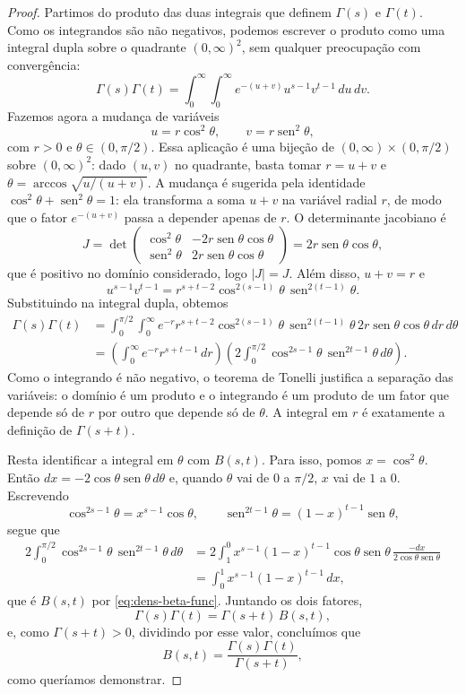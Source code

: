 \documentclass[12pt,portuguese]{article}
\theoremstyle{definition}
\theoremstyle{plainexercise}
\theoremstyle{starredexercise}
\theoremstyle{definition}
\renewcommand{\sin}{\operatorname{sen}}
\begin{document}
\begin{proof}
  Partimos do produto das duas integrais que definem $\Gamma(s)$ e
  $\Gamma(t)$. Como os integrandos são não negativos, podemos escrever o
  produto como uma integral dupla sobre o quadrante $(0,\infty)^2$, sem
  qualquer preocupação com convergência:
  \[
    \Gamma(s)\Gamma(t)
    = \int_0^{\infty}\!\!\int_0^{\infty}
      e^{-(u+v)} u^{s-1} v^{t-1}\,du\,dv.
  \]
  Fazemos agora a mudança de variáveis
  \[
    u = r\cos^2\theta, \qquad v = r\sin^2\theta,
  \]
  com $r>0$ e $\theta\in(0,\pi/2)$. Essa aplicação é uma bijeção de
  $(0,\infty)\times(0,\pi/2)$ sobre $(0,\infty)^2$: dado $(u,v)$ no quadrante,
  basta tomar $r=u+v$ e $\theta=\arccos\sqrt{u/(u+v)}$. A mudança é sugerida pela
  identidade $\cos^2\theta+\sin^2\theta=1$: ela transforma a
  soma $u+v$ na variável radial $r$, de modo que o fator $e^{-(u+v)}$
  passa a depender apenas de $r$. O determinante jacobiano é
  \[
    J = \det
    \begin{pmatrix}
      \cos^2\theta & -2r\sin\theta\cos\theta \\[0.2cm]
      \sin^2\theta & 2r\sin\theta\cos\theta
    \end{pmatrix}
    = 2r\sin\theta\cos\theta,
  \]
  que é positivo no domínio considerado, logo $|J| = J$. Além disso,
  $u+v = r$ e
  \[
    u^{s-1}v^{t-1}
    = r^{s+t-2}\cos^{2(s-1)}\theta\,\sin^{2(t-1)}\theta.
  \]
  Substituindo na integral dupla, obtemos
  \begin{align*}
    \Gamma(s)\Gamma(t)
    &= \int_0^{\pi/2}\!\!\int_0^{\infty}
       e^{-r} r^{s+t-2}\cos^{2(s-1)}\theta\,\sin^{2(t-1)}\theta\,
       2r\sin\theta\cos\theta\,dr\,d\theta \\
    &= \left(\int_0^{\infty} e^{-r} r^{s+t-1}\,dr\right)
       \left(2\int_0^{\pi/2}
       \cos^{2s-1}\theta\,\sin^{2t-1}\theta\,d\theta\right).
  \end{align*}
  Como o integrando é não negativo, o teorema de Tonelli justifica a
  separação das variáveis: o domínio é um produto e o integrando é um produto
  de um fator que depende só de $r$ por outro que depende só de $\theta$.
  A integral em $r$ é exatamente a definição de
  $\Gamma(s+t)$.

  Resta identificar a integral em $\theta$ com $B(s,t)$. Para isso,
  pomos $x=\cos^2\theta$. Então $dx = -2\cos\theta\sin\theta\,d\theta$
  e, quando $\theta$ vai de $0$ a $\pi/2$, $x$ vai de $1$ a $0$. Escrevendo
  \[
    \cos^{2s-1}\theta = x^{s-1}\cos\theta,
    \qquad
    \sin^{2t-1}\theta = (1-x)^{t-1}\sin\theta,
  \]
  segue que
  \[
    \begin{aligned}
      2\int_0^{\pi/2}
      \cos^{2s-1}\theta\,\sin^{2t-1}\theta\,d\theta
      &= 2\int_1^0 x^{s-1}(1-x)^{t-1}
        \cos\theta\sin\theta\,
        \frac{-dx}{2\cos\theta\sin\theta} \\[0.2cm]
      &= \int_0^1 x^{s-1}(1-x)^{t-1}\,dx,
    \end{aligned}
  \]
  que é $B(s,t)$ por \eqref{eq:dens-beta-func}. Juntando os dois fatores,
  \[
    \Gamma(s)\Gamma(t) = \Gamma(s+t)\,B(s,t),
  \]
  e, como $\Gamma(s+t)>0$, dividindo por esse valor, concluímos que 
  \[B(s,t) = \dfrac{\Gamma(s)\Gamma(t)}{\Gamma(s+t)},\] 
  como queríamos demonstrar. 
\end{proof}
\end{document}
